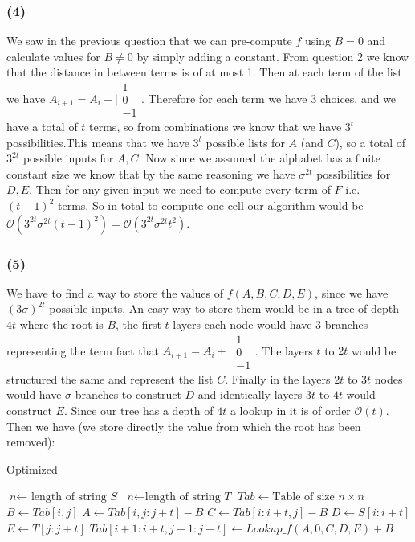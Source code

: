 \documentclass[10pt,a4paper]{article}
\begin{document}
\subsubsection*{(4)}
We saw in the previous question that we can pre-compute $f$ using $B=0$ and calculate values for $B \neq 0$ by simply adding a constant.  From question 2 we know that the distance in between terms is of at most 1. Then at each term of the list we have $A_{i + 1} = A_i + \Bigg|\begin{matrix}
1\\0\\-1
\end{matrix}$. Therefore for each term we have 3 choices, and we have a total of $t$ terms, so from combinations we know that we have $3^t$ possibilities.This means that we have $3^t$ possible lists for $A$ (and $C$), so a total of $3^{2t}$ possible inputs for $A, C$. Now since we assumed the alphabet has a finite constant size we know that by the same reasoning we have $\sigma^{2t}$ possibilities for $D, E$. Then for any given input we need to compute every term of $F$ i.e. $(t-1)^2$ terms. So in total to compute one cell our algorithm would be $\mathcal{O}(3^{2t} \sigma^{2t} (t - 1)^2) =  \mathcal{O}(3^{2t}\sigma^{2t}t^2)$.

\subsubsection*{(5)}
We have to find a way to store the values of $f(A, B, C, D, E)$, since we have $(3\sigma)^{2t}$ possible inputs. An easy way to store them would be in a tree of depth $4t$ where the root is $B$, the first $t$ layers each node would have 3 branches representing the term fact that $A_{i+1} = A_{i} + \Bigg|\begin{matrix}
1\\0\\-1
\end{matrix}$. The layers $t$ to $2t$ would be structured the same and represent the list $C$. Finally in the layers $2t$ to $3t$ nodes would have $\sigma$ branches to construct $D$ and identically layers $3t$ to $4t$ would construct $E$. Since our tree has a depth of $4t$ a lookup in it is of order $\mathcal{O}(t)$. Then we have (we store directly the value from which the root has been removed):
\begin{algorithm}
\caption{Optimized}\label{euclid}
\begin{algorithmic}[1]
\State $\textit{n} \gets \text{ length of string } \textit{S}$
\State $\textit{n} \gets \text{length of string } \textit{T}$
\State $\textit{Tab} \gets \text{Table }\text{of size } n \times n$
		\State $B \leftarrow Tab[i, j]$
		\State $A \leftarrow Tab[i, j:j+t] - B$
		\State $C \leftarrow Tab[i:i+t, j] - B$
		\State $D \leftarrow S[i:i+t]$
		\State $E \leftarrow T[j:j+t]$
		\State $Tab[i+1:i+t, j+1:j+t] \leftarrow Lookup\_ f(A, 0, C, D, E) + B$
	\EndFor
\EndFor
\EndProcedure
\end{algorithmic}
\end{algorithm}
\end{document}
